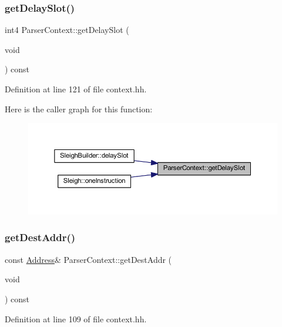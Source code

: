 \subsubsection{\texorpdfstring{getDelaySlot()}{getDelaySlot()}}
{\footnotesize\ttfamily int4 Parser\+Context\+::get\+Delay\+Slot (\begin{DoxyParamCaption}\item[{void}]{ }\end{DoxyParamCaption}) const\hspace{0.3cm}{\ttfamily [inline]}}



Definition at line 121 of file context.\+hh.

Here is the caller graph for this function\+:
\nopagebreak
\begin{figure}[H]
\begin{center}
\leavevmode
\includegraphics[width=350pt]{class_parser_context_a8a6526b4b2c1d0ee6cfee2cd5935dcbc_icgraph}
\end{center}
\end{figure}
\mbox{\label{class_parser_context_a85ee6aa4678230479716fbecb6be31cf}} 
\subsubsection{\texorpdfstring{getDestAddr()}{getDestAddr()}}
{\footnotesize\ttfamily const \mbox{\hyperlink{class_address}{Address}}\& Parser\+Context\+::get\+Dest\+Addr (\begin{DoxyParamCaption}\item[{void}]{ }\end{DoxyParamCaption}) const\hspace{0.3cm}{\ttfamily [inline]}}



Definition at line 109 of file context.\+hh.

